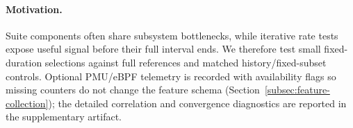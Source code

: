\documentclass[sigconf, review, anonymous, balance=false]{acmart}
\begin{document}


\paragraph{Motivation.}
\label{subsec:motivation-redundancy}
\label{subsec:motivation-convergence}
Suite components often share subsystem bottlenecks, while iterative rate tests expose useful signal before their full interval ends. We therefore test small fixed-duration selections against full references and matched history/fixed-subset controls. Optional PMU/eBPF telemetry is recorded with availability flags so missing counters do not change the feature schema (Section~\ref{subsec:feature-collection}); the detailed correlation and convergence diagnostics are reported in the supplementary artifact.
\end{document}
